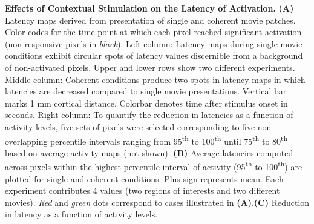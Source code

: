 \textbf{Effects of Contextual Stimulation on the Latency of Activation.}
\textbf{(A)} Latency maps derived from presentation of single and coherent
movie patches. Color codes for the time point at which each pixel reached
significant activation (non-responsive pixels in \textit{black}). Left column:
Latency maps during single movie conditions exhibit circular spots of
latency values discernible from a background of non-activated pixels.
Upper and lower rows show two different experiments. Middle column:
Coherent conditions produce two spots in latency maps in which latencies
are decreased compared to single movie presentations. Vertical bar marks 1
mm cortical distance. Colorbar denotes time after stimulus onset in
seconds.  Right column: To quantify the reduction in latencies as a
function of activity levels, five sets of pixels were selected
corresponding to five non-overlapping percentile intervals ranging from
95\textsuperscript{th} to 100\textsuperscript{th} until
75\textsuperscript{th} to 80\textsuperscript{th} based on average activity
maps (not shown). \textbf{(B)} Average latencies computed across pixels
within the highest percentile interval of activity (95\textsuperscript{th}
to 100\textsuperscript{th}) are plotted for single and coherent conditions.
Plus sign represents mean. Each experiment contributes 4 values (two
regions of interests and two different movies). \textit{Red} and
\textit{green} dots correspond to cases illustrated in
\textbf{(A)}.\textbf{(C)} Reduction in latency as a function of activity
levels.
